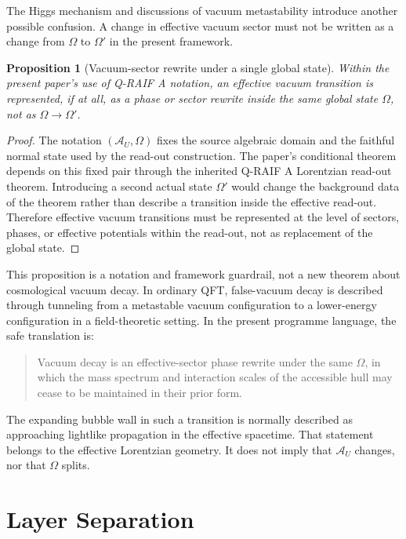 \documentclass[12pt,a4paper]{article}
\newtheorem{proposition}[theorem]{Proposition}
\theoremstyle{definition}
\theoremstyle{remark}
\newcommand{\AU}{\mathcal{A}_U}
\newcommand{\Omegastate}{\Omega}
\begin{document}
The Higgs mechanism and discussions of vacuum metastability introduce another possible confusion. A change in effective vacuum sector must not be written as a change from $\Omegastate$ to $\Omegastate'$ in the present framework.

\begin{proposition}[Vacuum-sector rewrite under a single global state]
\label{prop:vacuum-sector}
Within the present paper's use of Q-RAIF A notation, an effective vacuum transition is represented, if at all, as a phase or sector rewrite inside the same global state $\Omegastate$, not as $\Omegastate\to\Omegastate'$.
\end{proposition}

\begin{proof}
The notation $(\AU,\Omegastate)$ fixes the source algebraic domain and the faithful normal state used by the read-out construction. The paper's conditional theorem depends on this fixed pair through the inherited Q-RAIF A Lorentzian read-out theorem. Introducing a second actual state $\Omegastate'$ would change the background data of the theorem rather than describe a transition inside the effective read-out. Therefore effective vacuum transitions must be represented at the level of sectors, phases, or effective potentials within the read-out, not as replacement of the global state.
\end{proof}

This proposition is a notation and framework guardrail, not a new theorem about cosmological vacuum decay. In ordinary QFT, false-vacuum decay is described through tunneling from a metastable vacuum configuration to a lower-energy configuration in a field-theoretic setting. In the present programme language, the safe translation is:

\begin{quote}
Vacuum decay is an effective-sector phase rewrite under the same $\Omegastate$, in which the mass spectrum and interaction scales of the accessible hull may cease to be maintained in their prior form.
\end{quote}

The expanding bubble wall in such a transition is normally described as approaching lightlike propagation in the effective spacetime. That statement belongs to the effective Lorentzian geometry. It does not imply that $\AU$ changes, nor that $\Omegastate$ splits.

\section{Layer Separation}
\label{sec:layers}
\end{document}
